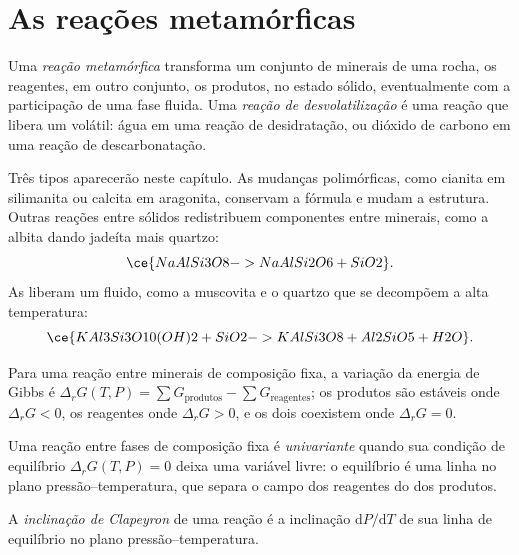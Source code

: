 \section{As reações metamórficas}\label{sec:b2:metamorphic-facies:reactions}

\begin{definition}\label{def:b2:metamorphic-facies:reaction}
Uma \emph{reação metamórfica} transforma um conjunto de minerais
de uma rocha, os reagentes, em outro conjunto, os produtos, no estado sólido, eventualmente
com a participação de uma fase fluida. Uma \emph{reação de desvolatilização}
é uma reação que libera um volátil: água em uma reação de desidratação, ou dióxido
de carbono em uma reação de descarbonatação.
\end{definition}

Três tipos aparecerão neste capítulo. As mudanças polimórficas, como cianita em
silimanita ou calcita em aragonita, conservam a fórmula e mudam a estrutura.
Outras reações entre sólidos redistribuem componentes entre minerais, como a
albita dando jadeíta mais quartzo:
\[
\ce{NaAlSi3O8 -> NaAlSi2O6 + SiO2}.
\]
As  liberam um fluido, como a muscovita e o quartzo que se decompõem
a alta temperatura:
\[
\ce{KAl3Si3O10(OH)2 + SiO2 -> KAlSi3O8 + Al2SiO5 + H2O}.
\]

Para uma reação entre minerais de composição fixa, a variação da energia de Gibbs é
$\Delta_r G(T, P) = \sum G_{\text{produtos}} - \sum G_{\text{reagentes}}$; os produtos
são estáveis onde $\Delta_r G < 0$, os reagentes onde $\Delta_r G > 0$, e os dois
coexistem onde $\Delta_r G = 0$.

\begin{definition}\label{def:b2:metamorphic-facies:univariant}
Uma reação entre fases de composição fixa é \emph{univariante}
quando sua condição de equilíbrio $\Delta_r G(T, P) = 0$ deixa uma variável
livre: o equilíbrio é uma linha no plano pressão--temperatura, que separa
o campo dos reagentes do dos produtos.
\end{definition}

\begin{definition}\label{def:b2:metamorphic-facies:clapeyron}
A \emph{inclinação de Clapeyron} de uma reação é a inclinação
$\mathrm dP/\mathrm dT$ de sua linha de equilíbrio no plano pressão--temperatura.
\end{definition}

